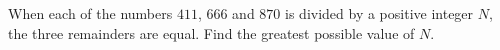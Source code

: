 When each of the numbers $411$, $666$ and $870$ is divided by a positive integer $N$, the three remainders are equal. Find the greatest possible value of $N$.
